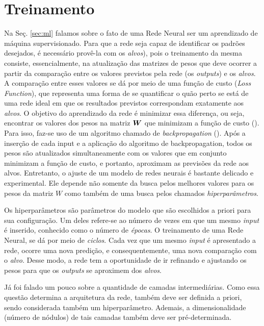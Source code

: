 \section{Treinamento}

Na Seç. \ref{sec:ml} falamos sobre o fato de uma Rede Neural ser um aprendizado de máquina supervisionado. Para que a rede seja capaz de identificar os padrões desejados, é necessário provê-la com os \textit{alvos}), pois o treinamento da mesma consiste, essencialmente, na atualização das matrizes de pesos que deve ocorrer a partir da comparação entre os valores previstos pela rede (os \textit{outputs}) e os \textit{alvos}. A comparação entre esses valores se dá por meio de uma função de custo (\textit{Loss Function}), que representa uma forma de se quantificar o quão perto se está de uma rede ideal em que os resultados previstos correspondam exatamente aos \textit{alvos}. O objetivo do aprendizado da rede é minimizar essa diferença, ou seja, encontrar os valores dos pesos na matriz $\bm{W}$ que minimizam a função de custo (\cite{josh:2017}). Para isso, faz-se uso de um algoritmo chamado de \textit{backpropagation} (\cite{Goodfellow-et-al-2016}). Após a inserção de cada input e a aplicação do algoritmo de backpropagation, todos os pesos são atualizados simultaneamente com os valores que em conjunto minimizam a função de custo, e portanto, aproximam as previsões da rede aos alvos. Entretanto, o ajuste de um modelo de redes neurais é bastante delicado e experimental. Ele depende não somente da busca pelos melhores valores para os pesos da matriz $W$ como também de uma busca pelos chamados \textit{hiperparâmetros}. 

Os hiperparâmetros são parâmetros do modelo que são escolhidos a priori para sua configuração. Um deles refere-se ao número de vezes em que um mesmo \textit{input} é inserido, conhecido como o número de \textit{épocas}. O treinamento de uma Rede Neural, se dá por meio de \textit{ciclos}. Cada vez que um mesmo \textit{input} é apresentado a rede, ocorre uma nova predição, e consequentemente, uma nova comparação com o \textit{alvo}. Desse modo, a rede tem a oportunidade de ir refinando e ajustando os pesos para que os \textit{outputs} se aproximem dos \textit{alvos}.

Já foi falado um pouco sobre a quantidade de camadas intermediárias. Como essa questão determina a arquitetura da rede, também deve ser definida a priori, sendo considerada também um hiperparâmetro. Ademais, a dimensionalidade (número de nódulos) de tais camadas também deve ser pré-determinada. 

